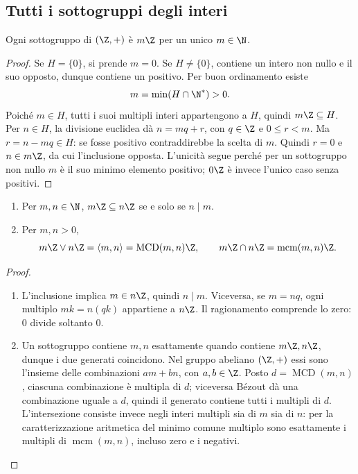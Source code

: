 \subsection{Tutti i sottogruppi degli interi}
\begin{proposizione}\label{prop:sottogruppi-Z}
Ogni sottogruppo di $(\Z,+)$ è $m\Z$ per un unico $m\in\N$.
\end{proposizione}
\begin{proof}
Se $H=\{0\}$, si prende $m=0$. Se $H\ne\{0\}$, contiene un intero non nullo e il suo opposto, dunque contiene un positivo. Per buon ordinamento esiste
\[
m=\min(H\cap\N^*)>0.
\]
Poiché $m\in H$, tutti i suoi multipli interi appartengono a $H$, quindi $m\Z\subseteq H$. Per $n\in H$, la divisione euclidea dà $n=mq+r$, con $q\in\Z$ e $0\le r<m$. Ma $r=n-mq\in H$: se fosse positivo contraddirebbe la scelta di $m$. Quindi $r=0$ e $n\in m\Z$, da cui l'inclusione opposta. L'unicità segue perché per un sottogruppo non nullo $m$ è il suo minimo elemento positivo; $0\Z$ è invece l'unico caso senza positivi.
\end{proof}

\begin{proposizione}\label{prop:reticolo-Z}
\begin{enumerate}[label=\arabic*.]
\item Per $m,n\in\N$, $m\Z\subseteq n\Z$ se e solo se $n\mid m$.
\item Per $m,n>0$,
\[
m\Z\vee n\Z=\langle m,n\rangle=\operatorname{MCD}(m,n)\Z,
\qquad m\Z\cap n\Z=\operatorname{mcm}(m,n)\Z.
\]
\end{enumerate}
\end{proposizione}
\begin{proof}
\begin{enumerate}[label=\arabic*.]
\item L'inclusione implica $m\in n\Z$, quindi $n\mid m$. Viceversa, se $m=nq$, ogni multiplo $mk=n(qk)$ appartiene a $n\Z$. Il ragionamento comprende lo zero: $0$ divide soltanto $0$.
\item Un sottogruppo contiene $m,n$ esattamente quando contiene $m\Z,n\Z$, dunque i due generati coincidono. Nel gruppo abeliano $(\Z,+)$ essi sono l'insieme delle combinazioni $am+bn$, con $a,b\in\Z$. Posto $d=\operatorname{MCD}(m,n)$, ciascuna combinazione è multipla di $d$; viceversa Bézout dà una combinazione uguale a $d$, quindi il generato contiene tutti i multipli di $d$. L'intersezione consiste invece negli interi multipli sia di $m$ sia di $n$: per la caratterizzazione aritmetica del minimo comune multiplo sono esattamente i multipli di $\operatorname{mcm}(m,n)$, incluso zero e i negativi.
\end{enumerate}
\end{proof}

